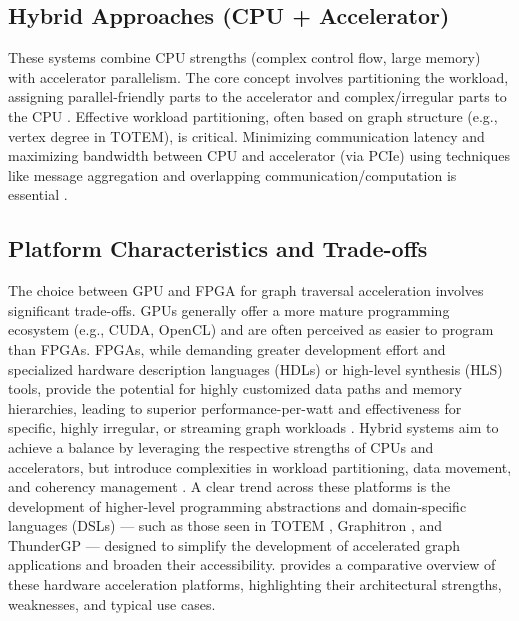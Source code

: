 \documentclass[sigconf,natbib=false]{acmart}
\begin{document}
\subsection{Hybrid Approaches (CPU + Accelerator)}
These systems combine CPU strengths (complex control flow, large memory) with accelerator parallelism.
The core concept involves partitioning the workload, assigning parallel-friendly parts to the accelerator and complex/irregular parts to the CPU \cite{gharaibehEfficientLargeScaleGraph}.
Effective workload partitioning, often based on graph structure (e.g., vertex degree in TOTEM), is critical.
Minimizing communication latency and maximizing bandwidth between CPU and accelerator (via PCIe) using techniques like message aggregation and overlapping communication/computation is essential \cite{dann2023FPGAbasedQueryAcceleration}.

\subsection*{Platform Characteristics and Trade-offs}
The choice between GPU and FPGA for graph traversal acceleration involves significant trade-offs.
GPUs generally offer a more mature programming ecosystem (e.g., CUDA, OpenCL) and are often perceived as easier to program than FPGAs.
FPGAs, while demanding greater development effort and specialized hardware description languages (HDLs) or high-level synthesis (HLS) tools, provide the potential for highly customized data paths and memory hierarchies, leading to superior performance-per-watt and effectiveness for specific, highly irregular, or streaming graph workloads \cite{besta2019GraphProcessingFPGAs}.
Hybrid systems aim to achieve a balance by leveraging the respective strengths of CPUs and accelerators, but introduce complexities in workload partitioning, data movement, and coherency management \cite{gharaibehEfficientLargeScaleGraph}.
A clear trend across these platforms is the development of higher-level programming abstractions and domain-specific languages (DSLs) --- such as those seen in TOTEM \cite{gharaibehEfficientLargeScaleGraph}, Graphitron \cite{zhang2024GraphitronDomainSpecific}, and ThunderGP \cite{chen2022ThunderGPResourceEfficientGraph} --- designed to simplify the development of accelerated graph applications and broaden their accessibility.
 provides a comparative overview of these hardware acceleration platforms, highlighting their architectural strengths, weaknesses, and typical use cases.
\end{document}
